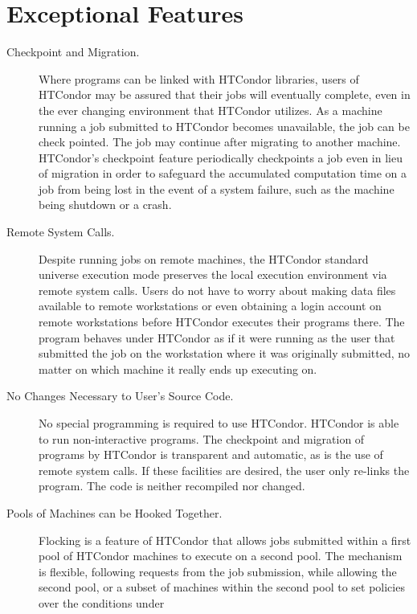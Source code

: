 \section{Exceptional Features}

\begin{description}
	\item[Checkpoint and Migration.] Where programs can be
linked with HTCondor libraries, users of HTCondor may be assured that
their jobs will eventually complete,
even in the ever changing environment that HTCondor
utilizes.
As a machine running a job submitted to HTCondor
becomes unavailable,
the job can be check pointed.
The job may continue after migrating 
to another machine.
HTCondor's checkpoint feature 
periodically checkpoints a job even in lieu of migration in order to
safeguard the accumulated computation time on a job from being lost in the
event of a system failure, such as the machine being shutdown or a crash.
	\item[Remote System Calls.] 
Despite running jobs on remote machines,
the HTCondor standard universe execution
mode preserves the local execution environment
via remote system calls. Users do not have to worry
about making data files available to remote workstations or even
obtaining a login account on remote workstations before HTCondor executes
their programs there. The program behaves under HTCondor as if it were
running as the user that submitted the job on the workstation where it
was originally submitted, no matter on which machine it really ends up
executing on.
	\item[No Changes Necessary to User's Source Code.] No special
programming is required to use HTCondor.
HTCondor is able to run non-interactive programs.
The checkpoint and migration of
programs by HTCondor is transparent and automatic, as is the use of
remote system calls.
If these facilities are desired, the user only
re-links the program.  The code is neither recompiled nor changed.
	\item[Pools of Machines can be Hooked Together.] Flocking is
a feature of HTCondor that allows jobs submitted within a first pool of
HTCondor machines to execute on a second pool.
The mechanism is flexible, following requests from the job
submission,
while allowing the second pool, or a subset of machines within
the second pool to set policies over the conditions under

\end{description}
